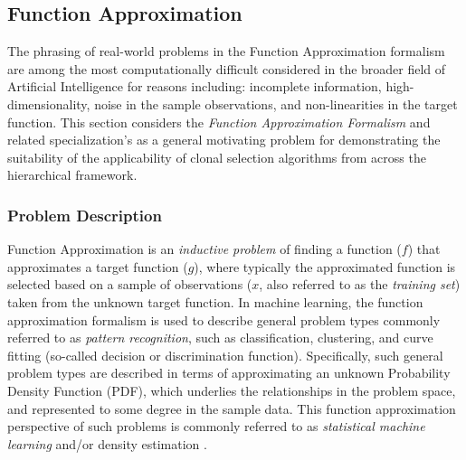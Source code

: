 \documentclass[a4paper, 11pt]{article}
\begin{document}
% 
%
\subsection{Function Approximation}
\label{subsec:function_approximation}
The phrasing of real-world problems in the Function Approximation formalism are among the most computationally difficult considered in the broader field of Artificial Intelligence for reasons including: incomplete information, high-dimensionality, noise in the sample observations, and non-linearities in the target function.
This section considers the \emph{Function Approximation Formalism} and related specialization's as a general motivating problem for demonstrating the suitability of the applicability of clonal selection algorithms from across the hierarchical framework.

%
%
\subsubsection{Problem Description}
Function Approximation is an \emph{inductive problem} of finding a function ($f$) that approximates a target function ($g$), where typically the approximated function is selected based on a sample of observations ($x$, also referred to as the \emph{training set}) taken from the unknown target function.
In machine learning, the function approximation formalism is used to describe general problem types commonly referred to as \emph{pattern recognition}, such as classification, clustering, and curve fitting (so-called decision or discrimination function). Specifically, such general problem types are described in terms of approximating an unknown Probability Density Function (PDF), which underlies the relationships in the problem space, and represented to some degree in the sample data. This function approximation perspective of such problems is commonly referred to as \emph{statistical machine learning} and/or density estimation \cite{Fukunaga1990, Bishop1995}.


%
%
\end{document}
